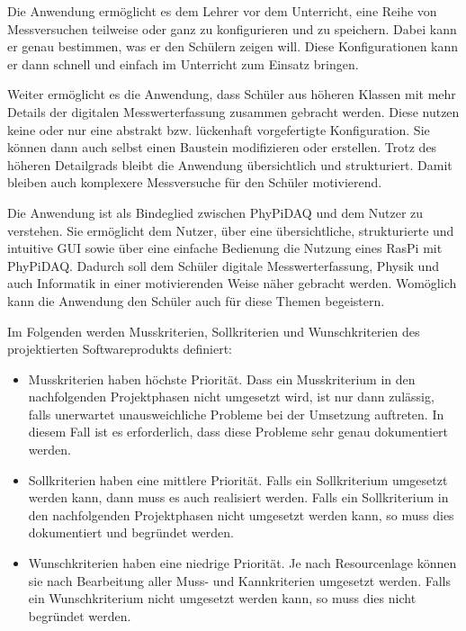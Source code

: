 \documentclass[parskip=full]{scrartcl}
\begin{document}
Die Anwendung ermöglicht es dem Lehrer vor dem Unterricht, eine Reihe von Messversuchen teilweise oder ganz zu konfigurieren und zu speichern. Dabei kann er genau bestimmen, was er den Schülern zeigen will. Diese Konfigurationen kann er dann schnell und einfach im Unterricht zum Einsatz bringen. 

Weiter ermöglicht es die Anwendung, dass Schüler aus höheren Klassen mit mehr Details der digitalen Messwerterfassung zusammen gebracht werden. Diese nutzen keine oder nur eine abstrakt bzw. lückenhaft vorgefertigte Konfiguration. Sie können dann auch selbst einen Baustein modifizieren oder erstellen. Trotz des höheren Detailgrads bleibt die Anwendung übersichtlich und strukturiert. Damit bleiben auch komplexere Messversuche für den Schüler motivierend. 

Die Anwendung ist als Bindeglied zwischen \gls{PhyPiDAQ} und dem Nutzer zu verstehen. Sie ermöglicht dem Nutzer, über eine übersichtliche, strukturierte und intuitive GUI sowie über eine einfache Bedienung die Nutzung eines \gls{RasPi} mit \gls{PhyPiDAQ}. Dadurch soll dem Schüler digitale Messwerterfassung, Physik und auch Informatik in einer motivierenden Weise näher gebracht werden. Womöglich kann die Anwendung den Schüler auch für diese Themen begeistern.  

Im Folgenden werden Musskriterien, Sollkriterien und Wunschkriterien des projektierten Softwareprodukts definiert:

\begin{itemize}
	\item Musskriterien haben höchste Priorität. 
	Dass ein Musskriterium in den nachfolgenden Projektphasen nicht umgesetzt wird, ist nur dann zulässig, falls unerwartet unausweichliche Probleme bei der Umsetzung auftreten. 
	In diesem Fall ist es erforderlich, dass diese Probleme sehr genau dokumentiert werden.
	
	\item Sollkriterien haben eine mittlere Priorität. 
	Falls ein Sollkriterium umgesetzt werden kann, dann muss es auch realisiert werden. 
	Falls ein Sollkriterium in den nachfolgenden Projektphasen nicht umgesetzt werden kann, so muss dies dokumentiert und begründet werden. 
	
	\item Wunschkriterien haben eine niedrige Priorität. 
	Je nach Resourcenlage können sie nach Bearbeitung aller Muss- und Kannkriterien umgesetzt werden. 
	Falls ein Wunschkriterium nicht umgesetzt werden kann, so muss dies nicht begründet werden. 
\end{itemize}
\end{document}
